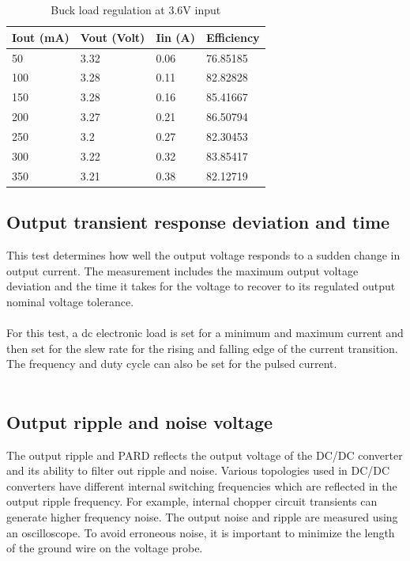 \\ \\
\begin{table}[h]
\centering
\begin{tabular}{|l|l|l|l|}
\hline
Iout (mA) & Vout (Volt) & Iin (A) & Efficiency \\ \hline
50        & 3.32        & 0.06    & 76.85185   \\ \hline
100       & 3.28        & 0.11    & 82.82828   \\ \hline
150       & 3.28        & 0.16    & 85.41667   \\ \hline
200       & 3.27        & 0.21    & 86.50794   \\ \hline
250       & 3.2         & 0.27    & 82.30453   \\ \hline
300       & 3.22        & 0.32    & 83.85417   \\ \hline
350       & 3.21        & 0.38    & 82.12719   \\ \hline
\end{tabular}
\caption{Buck load regulation at 3.6V input}
\label{table:4}
\end{table}
\subsection{Output transient response deviation and time}

 This test determines how well the output voltage responds to a sudden change in output current. The measurement includes the maximum output voltage deviation and the time it takes for the voltage to recover to its regulated output nominal voltage tolerance.
\\ \\
For this test, a dc electronic load is set for a minimum and maximum current and then set for the slew rate for the rising and falling edge of the current transition. The frequency and duty cycle can also be set for the pulsed current.
\\ \\
\subsection{Output ripple and noise voltage} 

The output ripple and PARD reflects the output voltage of the DC/DC converter and its ability to filter out ripple and noise. Various topologies used in DC/DC converters have different internal switching frequencies which are reflected in the output ripple frequency. For example, internal chopper circuit transients can generate higher frequency noise. The output noise and ripple are measured using an oscilloscope. To avoid erroneous noise, it is important to minimize the length of the ground wire on the voltage probe.
\\ \\
